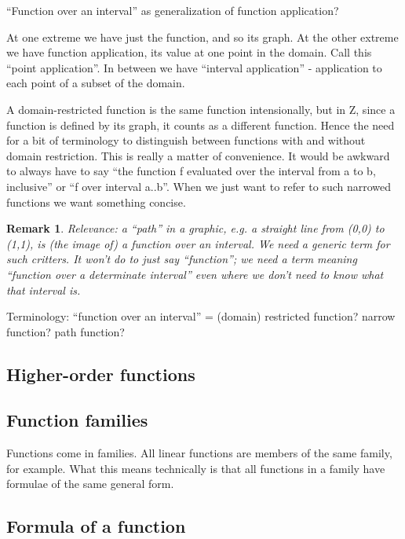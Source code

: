 \documentclass[12pt]{tufte-handout}
\numberwithin{equation}{subsection}
\numberwithin{equation}{subsection}
\newtheorem{remark}{Remark}
\begin{document}
  ``Function over an interval'' as generalization of function application?

  At one extreme we have just the function, and so its graph.  At the
  other extreme we have function application, its value at one point
  in the domain.  Call this ``point application''.  In between we have
  ``interval application'' - application to each point of a subset of
  the domain.

  A domain-restricted function is the same function intensionally, but
  in Z, since a function is defined by its graph, it counts as a
  different function.  Hence the need for a bit of terminology to
  distinguish between functions with and without domain restriction.
  This is really a matter of convenience.  It would be awkward to
  always have to say ``the function f evaluated over the interval from
  a to b, inclusive'' or ``f over interval a..b''.  When we just want
  to refer to such narrowed functions we want something concise.

  \begin{remark}
    Relevance: a ``path'' in a graphic, e.g. a straight line from
    (0,0) to (1,1), is (the image of) a function over an interval.  We
    need a generic term for such critters.  It won't do to just say
    ``function''; we need a term meaning ``function over a determinate
    interval'' even where we don't need to know what that interval is.
  \end{remark}

  {\todo Terminology: ``function over an interval'' = (domain)
    restricted function?  narrow function?  path function?}


  \subsection{Higher-order functions}
  \label{subs:hiordfunc}


  \subsection{Function families}
  \label{subs:funcfamilies}

  Functions come in families.  All linear functions are members of the
  same family, for example.  What this means technically is that all
  functions in a family have formulae of the same general form.

  \subsection{Formula of a function}
  \label{subs:funcform}
\end{document}
